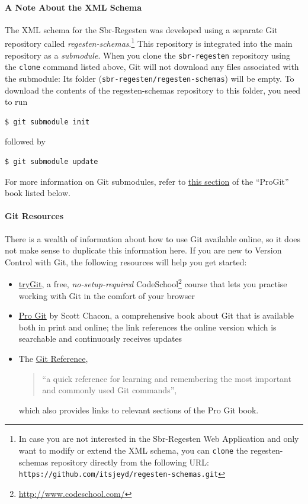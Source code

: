 \paragraph{A Note About the XML Schema}
The XML schema for the Sbr-Regesten was developed using a separate Git
repository called \emph{regesten-schemas}.\footnote{In case you are
  not interested in the Sbr-Regesten Web Application and only want to
  modify or extend the XML schema, you can \texttt{clone} the
  regesten-schemas repository directly from the following URL:
  \texttt{https://github.com/itsjeyd/regesten-schemas.git}} This
repository is integrated into the main repository as a
\emph{submodule}. When you clone the \texttt{sbr-regesten} repository
using the \texttt{clone} command listed above, Git will not download
any files associated with the submodule: Its folder
(\texttt{sbr-regesten/regesten-schemas}) will be empty. To download
the contents of the regesten-schemas repository to this folder, you
need to run

\begin{verbatim}
$ git submodule init
\end{verbatim}

followed by

\begin{verbatim}
$ git submodule update
\end{verbatim}

For more information on Git submodules, refer to
\href{http://git-scm.com/book/en/Git-Tools-Submodules}{this section}
of the ``ProGit'' book listed below.

\paragraph{Git Resources}
There is a wealth of information about how to use Git available
online, so it does not make sense to duplicate this information here.
If you are new to Version Control with Git, the following resources
will help you get started:

\begin{itemize}
\item \href{http://try.github.com/levels/1/challenges/1}{tryGit}, a
  free, \emph{no-setup-required}
  CodeSchool\footnote{\url{http://www.codeschool.com/}} course that
  lets you practise working with Git in the comfort of your browser
\item \href{http://git-scm.com/book}{Pro Git} by Scott Chacon, a
  comprehensive book about Git that is available both in print and
  online; the link references the online version which is searchable
  and continuously receives updates
\item The \href{http://gitref.org/}{Git Reference},
  \begin{quote}
    ``a quick reference for learning and remembering the most
    important and commonly used Git commands'',
  \end{quote}
  which also provides links to relevant sections of the Pro Git book.
\end{itemize}

